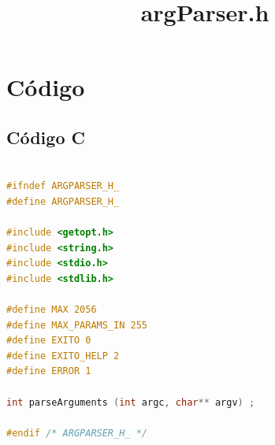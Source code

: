 \documentclass[a4paper,10pt]{article}
\begin{document}
\newpage

\section{C\'odigo}


\subsection{C\'odigo C}
\title{argParser.h}
\begin{lstlisting}[language=C]

#ifndef ARGPARSER_H_
#define ARGPARSER_H_

#include <getopt.h>
#include <string.h>
#include <stdio.h>
#include <stdlib.h>

#define MAX 2056
#define MAX_PARAMS_IN 255
#define EXITO 0
#define EXITO_HELP 2
#define ERROR 1

int parseArguments (int argc, char** argv) ;

#endif /* ARGPARSER_H_ */

\end{lstlisting}
\end{document}
